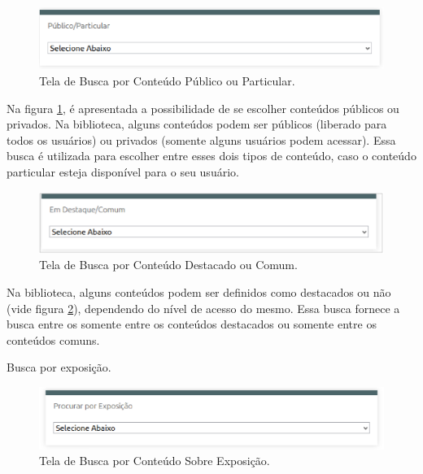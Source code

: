 \graphicspath{{figuras/prototipo/}}
\begin{figure}[H]
\centering
\includegraphics[width=1.0\textwidth]{busca-pub-particular}
\caption{Tela de Busca por Conteúdo Público ou Particular.}
\label{fig:buscaconteudo_prototipo}
\end{figure}

Na figura \ref{fig:buscaconteudo_prototipo}, é apresentada a possibilidade de se escolher conteúdos públicos ou privados. Na biblioteca, alguns conteúdos podem ser públicos (liberado para todos os usuários) ou privados (somente alguns usuários podem acessar). Essa busca é utilizada para escolher entre esses dois tipos de conteúdo, caso o conteúdo particular esteja disponível para o seu usuário.

\graphicspath{{figuras/prototipo/}}
\begin{figure}[H]
\centering
\includegraphics[width=1.0\textwidth]{busca-destacado}
\caption{Tela de Busca por Conteúdo Destacado ou Comum.}
\label{fig:buscadestacado_prototipo}
\end{figure}

Na biblioteca, alguns conteúdos podem ser definidos como destacados ou não (vide figura \ref{fig:buscadestacado_prototipo}), dependendo do nível de acesso do mesmo. Essa busca fornece a busca entre os somente entre os conteúdos destacados ou somente entre os conteúdos comuns.

Busca por exposição.

\graphicspath{{figuras/prototipo/}}
\begin{figure}[H]
\centering
\includegraphics[width=1.0\textwidth]{busca-exposicao}
\caption{Tela de Busca por Conteúdo Sobre Exposição.}
\label{fig:buscaexposicao_prototipo}
\end{figure}


